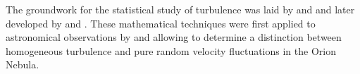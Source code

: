 


The groundwork for the statistical study of turbulence was laid by \citet{taylor1935i,taylor1935ii} and \citet{karman1937statistical} and later developed by \citet{kolm1,kolm2} and \citet{heisenberg1951stability}. 
These mathematical techniques were first applied to astronomical observations by \citet{von1951methode} and \citet{munch1958internal} allowing to determine a distinction between homogeneous turbulence and pure random velocity fluctuations in the Orion Nebula. 







